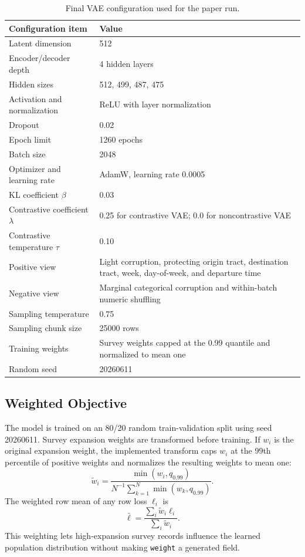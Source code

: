 \documentclass[3p,times,procedia]{elsarticle}
\begin{document}
\begin{table}[H]
\centering
\caption{Final VAE configuration used for the paper run.}
\label{tab:vae-config}
\footnotesize
\begin{tabular}{ll}
\toprule
\textbf{Configuration item} & \textbf{Value} \\
\midrule
Latent dimension & \num{512} \\
Encoder/decoder depth & \num{4} hidden layers \\
Hidden sizes & \num{512}, \num{499}, \num{487}, \num{475} \\
Activation and normalization & ReLU with layer normalization \\
Dropout & 0.02 \\
Epoch limit & \num{1260} epochs \\
Batch size & \num{2048} \\
Optimizer and learning rate & AdamW, learning rate \num{0.0005} \\
KL coefficient $\beta$ & 0.03 \\
Contrastive coefficient $\lambda$ & 0.25 for contrastive VAE; 0.0 for noncontrastive VAE \\
Contrastive temperature $\tau$ & 0.10 \\
Positive view & Light corruption, protecting origin tract, destination tract, week, day-of-week, and departure time \\
Negative view & Marginal categorical corruption and within-batch numeric shuffling \\
Sampling temperature & 0.75 \\
Sampling chunk size & \num{25000} rows \\
Training weights & Survey weights capped at the 0.99 quantile and normalized to mean one \\
Random seed & \num{20260611} \\
\bottomrule
\end{tabular}
\end{table}

\subsection{Weighted Objective}
The model is trained on an 80/20 random train-validation split using seed \num{20260611}. Survey expansion weights are transformed before training. If $w_i$ is the original expansion weight, the implemented transform caps $w_i$ at the 99th percentile of positive weights and normalizes the resulting weights to mean one:
\[
    \tilde w_i =
    \frac{\min(w_i, q_{0.99})}{N^{-1}\sum_{k=1}^{N}\min(w_k, q_{0.99})}.
\]
The weighted row mean of any row loss $\ell_i$ is
\[
    \bar{\ell} = \frac{\sum_i \tilde w_i \ell_i}{\sum_i \tilde w_i}.
\]
This weighting lets high-expansion survey records influence the learned population distribution without making \texttt{weight} a generated field.
\end{document}
